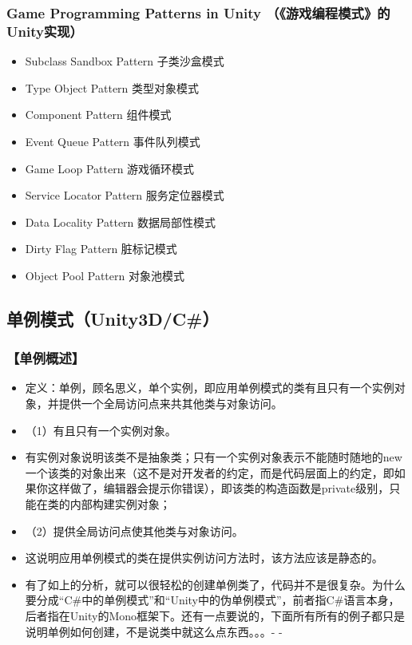 \documentclass[9pt, b5paper]{article}
\begin{document}
\subsubsection{Game Programming Patterns in Unity （《游戏编程模式》的Unity实现）}
\label{sec:org26c3ae8}
\begin{itemize}
\item Subclass Sandbox Pattern 子类沙盒模式
\item Type Object Pattern 类型对象模式
\item Component Pattern 组件模式
\item Event Queue Pattern 事件队列模式
\item Game Loop Pattern 游戏循环模式
\item Service Locator Pattern 服务定位器模式
\item Data Locality Pattern 数据局部性模式
\item Dirty Flag Pattern 脏标记模式
\item Object Pool Pattern 对象池模式
\end{itemize}


\subsection{单例模式（Unity3D/C\#）}
\label{sec:orga6b8534}
\subsubsection{【单例概述】}
\label{sec:org4a2a56a}
\begin{itemize}
\item 定义：单例，顾名思义，单个实例，即应用单例模式的类有且只有一个实例对象，并提供一个全局访问点来共其他类与对象访问。
\item （1）有且只有一个实例对象。
\item 有实例对象说明该类不是抽象类；只有一个实例对象表示不能随时随地的new一个该类的对象出来（这不是对开发者的约定，而是代码层面上的约定，即如果你这样做了，编辑器会提示你错误），即该类的构造函数是private级别，只能在类的内部构建实例对象；
\item （2）提供全局访问点使其他类与对象访问。
\item 这说明应用单例模式的类在提供实例访问方法时，该方法应该是静态的。
\item 有了如上的分析，就可以很轻松的创建单例类了，代码并不是很复杂。为什么要分成“C\#中的单例模式”和“Unity中的伪单例模式”，前者指C\#语言本身，后者指在Unity的Mono框架下。还有一点要说的，下面所有所有的例子都只是说明单例如何创建，不是说类中就这么点东西。。。- -
\end{itemize}
\end{document}
